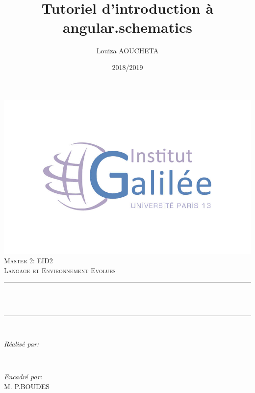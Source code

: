 \documentclass[12pt,french]{article}
\title{Tutoriel d'introduction à angular.schematics}
\author{Louiza AOUCHETA}
\date{2018/2019}
\makeatletter
\let\thetitle\@title
\let\theauthor\@author
\let\thedate\@date
\makeatother
\begin{document}

\begin{titlepage}
\centering 
\includegraphics[scale=0.25]{logo.jpg} \\
    \vspace*{0.5 cm}
    \textsc{\LARGE Master 2: EID2}\\[2.0 cm]	
	\textsc{\large Langage et Environnement Evolues}\\[0.5 cm]			
	\rule{\linewidth}{0.2 mm} \\[0.4 cm]
	{ \huge \bfseries \thetitle}\\
	\rule{\linewidth}{0.2 mm} \\[1.5 cm]
	
	\begin{minipage}{0.4\textwidth}
		\begin{flushleft} \large
			\emph{Réalisé par:}\\
			\theauthor
			\end{flushleft}
			\end{minipage}~
			\begin{minipage}{0.4\textwidth}
			\begin{flushright} \large
			\emph{Encadré par:} \\
			M. P.BOUDES									%
		\end{flushright}
	\end{minipage}\\[2 cm]
	
	{\large \thedate}\\[2 cm]
 
	\vfill
	
\end{titlepage}
\end{document}
